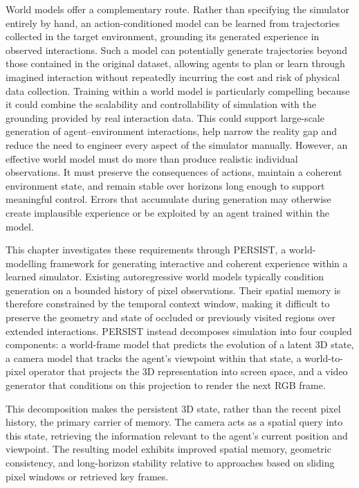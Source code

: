 World models offer a complementary route. Rather than specifying the simulator entirely by hand, an action-conditioned model can be learned from trajectories collected in the target environment, grounding its generated experience in observed interactions. Such a model can potentially generate trajectories beyond those contained in the original dataset, allowing agents to plan or learn through imagined interaction without repeatedly incurring the cost and risk of physical data collection. Training within a world model is particularly compelling because it could combine the scalability and controllability of simulation with the grounding provided by real interaction data. This could support large-scale generation of agent--environment interactions, help narrow the reality gap and reduce the need to engineer every aspect of the simulator manually. However, an effective world model must do more than produce realistic individual observations. It must preserve the consequences of actions, maintain a coherent environment state, and remain stable over horizons long enough to support meaningful control. Errors that accumulate during generation may otherwise create implausible experience or be exploited by an agent trained within the model.

This chapter investigates these requirements through \hbox{PERSIST}, a world-modelling framework for generating interactive and coherent experience within a learned simulator. Existing autoregressive world models typically condition generation on a bounded history of pixel observations. Their spatial memory is therefore constrained by the temporal context window, making it difficult to preserve the geometry and state of occluded or previously visited regions over extended interactions. PERSIST instead decomposes simulation into four coupled components: a world-frame model that predicts the evolution of a latent 3D state, a camera model that tracks the agent's viewpoint within that state, a world-to-pixel operator that projects the 3D representation into screen space, and a video generator that conditions on this projection to render the next RGB frame.

This decomposition makes the persistent 3D state, rather than the recent pixel history, the primary carrier of memory. The camera acts as a spatial query into this state, retrieving the information relevant to the agent's current position and viewpoint. The resulting model exhibits improved spatial memory, geometric consistency, and long-horizon stability relative to approaches based on sliding pixel windows or retrieved key frames. 

